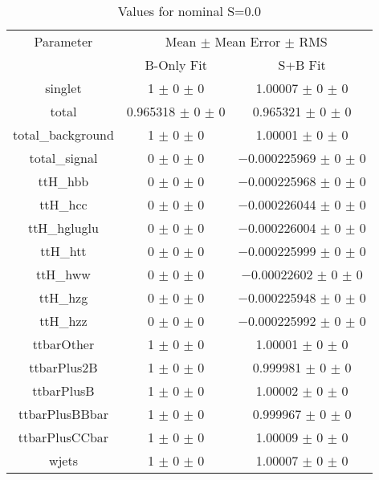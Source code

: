 \begin{table}
\centering
\caption{Values for nominal S=0.0}
\begin{tabular}{ccc}
\toprule
Parameter & \multicolumn{2}{c}{Mean $\pm$ Mean Error $\pm$ RMS}\\
 & B-Only Fit & S+B Fit\\
\midrule
singlet & \num{1} $\pm$ \num{0} $\pm$ \num{0} & \num{1.00007} $\pm$ \num{0} $\pm$ \num{0}\\
total & \num{0.965318} $\pm$ \num{0} $\pm$ \num{0} & \num{0.965321} $\pm$ \num{0} $\pm$ \num{0}\\
total\_background & \num{1} $\pm$ \num{0} $\pm$ \num{0} & \num{1.00001} $\pm$ \num{0} $\pm$ \num{0}\\
total\_signal & \num{0} $\pm$ \num{0} $\pm$ \num{0} & \num{-0.000225969} $\pm$ \num{0} $\pm$ \num{0}\\
ttH\_hbb & \num{0} $\pm$ \num{0} $\pm$ \num{0} & \num{-0.000225968} $\pm$ \num{0} $\pm$ \num{0}\\
ttH\_hcc & \num{0} $\pm$ \num{0} $\pm$ \num{0} & \num{-0.000226044} $\pm$ \num{0} $\pm$ \num{0}\\
ttH\_hgluglu & \num{0} $\pm$ \num{0} $\pm$ \num{0} & \num{-0.000226004} $\pm$ \num{0} $\pm$ \num{0}\\
ttH\_htt & \num{0} $\pm$ \num{0} $\pm$ \num{0} & \num{-0.000225999} $\pm$ \num{0} $\pm$ \num{0}\\
ttH\_hww & \num{0} $\pm$ \num{0} $\pm$ \num{0} & \num{-0.00022602} $\pm$ \num{0} $\pm$ \num{0}\\
ttH\_hzg & \num{0} $\pm$ \num{0} $\pm$ \num{0} & \num{-0.000225948} $\pm$ \num{0} $\pm$ \num{0}\\
ttH\_hzz & \num{0} $\pm$ \num{0} $\pm$ \num{0} & \num{-0.000225992} $\pm$ \num{0} $\pm$ \num{0}\\
ttbarOther & \num{1} $\pm$ \num{0} $\pm$ \num{0} & \num{1.00001} $\pm$ \num{0} $\pm$ \num{0}\\
ttbarPlus2B & \num{1} $\pm$ \num{0} $\pm$ \num{0} & \num{0.999981} $\pm$ \num{0} $\pm$ \num{0}\\
ttbarPlusB & \num{1} $\pm$ \num{0} $\pm$ \num{0} & \num{1.00002} $\pm$ \num{0} $\pm$ \num{0}\\
ttbarPlusBBbar & \num{1} $\pm$ \num{0} $\pm$ \num{0} & \num{0.999967} $\pm$ \num{0} $\pm$ \num{0}\\
ttbarPlusCCbar & \num{1} $\pm$ \num{0} $\pm$ \num{0} & \num{1.00009} $\pm$ \num{0} $\pm$ \num{0}\\
wjets & \num{1} $\pm$ \num{0} $\pm$ \num{0} & \num{1.00007} $\pm$ \num{0} $\pm$ \num{0}\\
\bottomrule
\end{tabular}
\end{table}